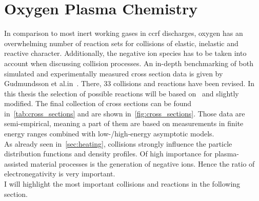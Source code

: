 %
	\section{Oxygen Plasma Chemistry}\label{sec:negionphysics}
%
%
		In comparison to most inert working gases in ccrf discharges, oxygen has an overwhelming number of reaction sets for collisions of elastic, inelastic and reactive character. Additionally, the negative ion species has to be taken into account when discussing collision processes. An in-depth benchmarking of both simulated and experimentally measured cross section data is given by Gudmundsson et al.\@ in~\cite{Gudmundsson13}. There, 33 collisions and reactions have been revised. In this thesis the selection of possible reactions will be based on~\cite{Bronold07b} and slightly modified. The final collection of cross sections can be found in~\autoref{tab:cross_sections} and are shown  in~\autoref{fig:cross_sections}. Those data are semi-empirical, meaning a part of them are based on measurements in finite energy ranges combined with low-/high-energy asymptotic models.\\
		As already seen in~\autoref{sec:heating}, collisions strongly influence the particle distribution functions and density profiles. Of high importance for plasma-assisted material processes is the generation of negative ions. Hence the ratio of electronegativity is very important.\\
		I will highlight the most important collisions and reactions in the following section. 
%
